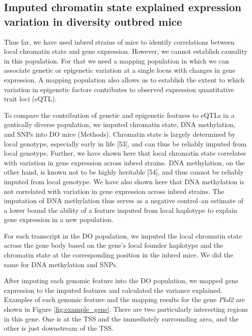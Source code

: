 \documentclass[10pt,letterpaper]{article}
\begin{document}
\hypertarget{imputed-chromatin-state-explained-expression-variation-in-diversity-outbred-mice}{%
\subsection{Imputed chromatin state explained expression variation in
diversity outbred
mice}\label{imputed-chromatin-state-explained-expression-variation-in-diversity-outbred-mice}}

Thus far, we have used inbred strains of mice to identify correlations
between local chromatin state and gene expression. However, we cannot
establish causality in this population. For that we need a mapping
population in which we can associate genetic or epigenetic variation at
a single locus with changes in gene expression. A mapping population
also allows us to establish the extent to which variation in epigenetic
factors contributes to observed expression quantitative trait loci
(eQTL).

To compare the contribution of genetic and epigenetic features to eQTLs
in a gentically diverse population, we imputed chromatin state, DNA
methylation, and SNPs into DO mice (Methods). Chromatin state is largely
determined by local genotype, especially early in life {[}53{]}, and can
thus be reliably imputed from local genotype. Further, we have shown
here that local chromatin state correlates with variation in gene
expression across inbred strains. DNA methylation, on the other hand, is
known not to be highly heritable {[}54{]}, and thus cannot be reliably
imputed from local genotype. We have also shown here that DNA
methylation is not correlated with variation in gene expression across
inbred strains. The imputation of DNA methylation thus serves as a
negative control--an estimate of a lower bound the ability of a feature
imputed from local haplotype to explain gene expression in a new
population.

For each transcript in the DO population, we imputed the local chromatin
state across the gene body based on the gene's local founder haplotype
and the chromatin state at the corresponding position in the inbred
mice. We did the same for DNA methylation and SNPs.

After imputing each genomic feature into the DO population, we mapped
gene expression to the imputed features and calculated the variance
explained. Examples of each genomic feature and the mapping results for
the gene \textit{Pkd2} are shown in Figure \ref{fig:example_gene}. There
are two particularly interesting regions in this gene. One is at the TSS
and the immediately surrounding area, and the other is just downstream
of the TSS.
\end{document}
